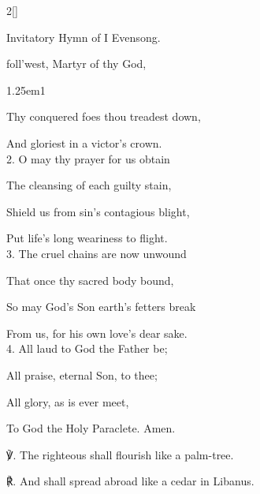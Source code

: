 \begin{paracol}{2}[]
\switchcolumn

\mattins



\begin{hymnRubric}
	Invitatory Hymn of I Evensong.
\end{hymnRubric}

\mattinsOfficeHymn\label{MartyrMattins}

 foll'west, Martyr of thy God,


\begin{hangparas}{1.25em}{1}
	
Thy conquered foes thou treadest down,

And gloriest in a victor's crown.\\

2. O may thy prayer for us obtain

The cleansing of each guilty stain,

Shield us from sin's contagious blight,

Put life's long weariness to flight.\\

3. The cruel chains are now unwound

That once thy sacred body bound, 

So may God's Son earth's fetters break

From us, for his own love's dear sake.\\

4. All laud to God the Father be;

All praise, eternal Son, to thee;

All glory, as is ever meet,

To God the Holy Paraclete. Amen.\\
\end{hangparas}

℣. The righteous shall flourish like a palm-tree.

℟. And shall spread abroad like a cedar in Libanus.


\fussy
\end{paracol}

